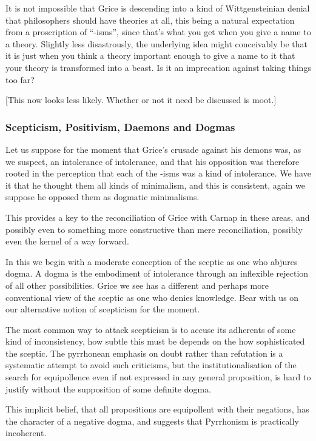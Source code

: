 \documentclass[10pt,titlepage]{book}
\begin{document}
It is not impossible that Grice is descending into a kind of Wittgensteinian denial that philosophers should have theories at all, this being a natural expectation from a proscription of ``-isms'', since that's what you get when you give a name to a theory.
Slightly less disastrously, the underlying idea might conceivably be that it is just when you think a theory important enough to give a name to it that your theory is transformed into a beast.
Is it an imprecation against taking things too far?

[This now looks less likely.  Whether or not it need be discussed is moot.]

\subsubsection{Scepticism, Positivism, Daemons and Dogmas}

Let us suppose for the moment that Grice's crusade against his demons was, as we suspect, an intolerance of intolerance, and that his opposition was therefore rooted in the perception that each of the -isms was a kind of intolerance.
We have it that he thought them all kinds of minimalism, and this is consistent, again we suppose he opposed them as dogmatic minimalisms.

This provides a key to the reconciliation of Grice with Carnap in these areas, and possibly even to something more constructive than mere reconciliation, possibly even the kernel of a way forward.

In this we begin with a moderate conception of the sceptic as one who abjures dogma.
A dogma is the embodiment of intolerance through an inflexible rejection of all other possibilities.
Grice we see has a different and perhaps more conventional view of the sceptic as one who denies knowledge.
Bear with us on our alternative notion of scepticism for the moment.

The most common way to attack scepticism is to accuse its adherents of some kind of inconsistency, how subtle this must be depends on the how sophisticated the sceptic.
The pyrrhonean emphasis on doubt rather than refutation is a systematic attempt to avoid such criticisms, but the institutionalisation of the search for equipollence even if not expressed in any general proposition, is hard to justify without the supposition of some definite dogma.

This implicit belief, that all propositions are equipollent with their negations, has the character of a negative dogma, and suggests that Pyrrhonism is practically incoherent.
\end{document}
